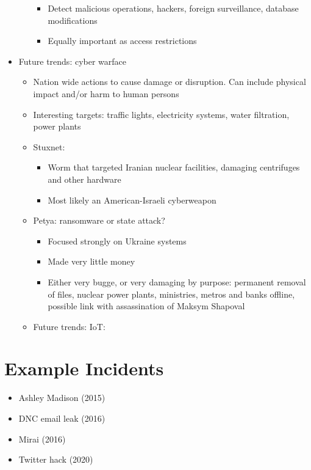 \documentclass[11pt,british,faculty=ea,layout=titlefont,underline=false,titleUppercase=true,titleUnderline=true,hidelinks]{ugent2016-report}
\begin{document}
\begin{itemize}
\begin{itemize}
\begin{itemize}
						\item Detect malicious operations, hackers, foreign surveillance, database modifications
						\item Equally important as access restrictions
					\end{itemize}
			\end{itemize}
		\item Future trends: cyber warface
		\begin{itemize}
			\item Nation wide actions to cause damage or disruption. Can include physical impact and/or harm to human persons
			\item Interesting targets: traffic lights, electricity systems, water filtration, power plants
			\item Stuxnet:
				\begin{itemize}
					\item Worm that targeted Iranian nuclear facilities, damaging centrifuges and other hardware
					\item Most likely an American-Israeli cyberweapon
				\end{itemize}
			\item Petya: ransomware or state attack?
				\begin{itemize}
					\item Focused strongly on Ukraine systems
					\item Made very little money
					\item Either very bugge, or very damaging by purpose: permanent removal of files, nuclear power plants, ministries, metros and banks offline, possible link with assassination of Maksym Shapoval
				\end{itemize}
			\item Future trends: IoT:  \cite{Ford2013}
		\end{itemize} 
	\end{itemize}

\section{Example Incidents} \label{sec:example-incidents}
	\begin{itemize}
		\item Ashley Madison (2015)
		\item DNC email leak (2016)
		\item Mirai (2016)
		\item Twitter hack (2020)
	\end{itemize}
\end{document}

